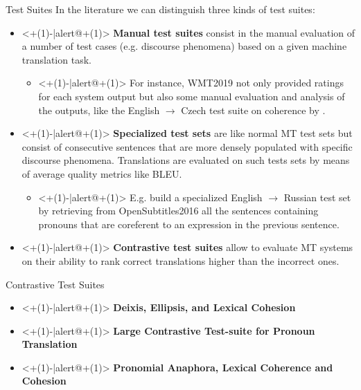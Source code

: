 \begin{frame}{Test Suites}\label{fr:test_suites_intro}
	In the literature we can distinguish three kinds of test suites:
	\begin{itemize}
		\item<+(1)-|alert@+(1)> \textbf{Manual test suites} consist in the manual evaluation of a number of test cases (e.g. discourse phenomena) based on a given machine translation task.
		\begin{itemize}
			\item<+(1)-|alert@+(1)> For instance, WMT2019 not only provided ratings for each system output but also some manual evaluation and analysis of the outputs, like the English $\rightarrow$ Czech test suite on coherence by \cite{rysova_test_2019}.
		\end{itemize}
		\item<+(1)-|alert@+(1)> \textbf{Specialized test sets} are like normal MT test sets but consist of consecutive sentences that are more densely populated with specific discourse phenomena. Translations are evaluated on such tests sets by means of average quality metrics like BLEU.
		\begin{itemize}
			\item<+(1)-|alert@+(1)> E.g. \cite{voita_context-aware_2018} build a specialized English $\rightarrow$ Russian test set by retrieving from OpenSubtitles2016 all the sentences containing pronouns that are coreferent to an expression in the previous sentence.
		\end{itemize}
		\item<+(1)-|alert@+(1)> \textbf{Contrastive test suites} allow to evaluate MT systems on their ability to rank correct translations higher than the incorrect ones.
	\end{itemize}
\end{frame}

\begin{frame}{Contrastive Test Suites}
	\begin{itemize}
		\item<+(1)-|alert@+(1)>  \textbf{Deixis, Ellipsis, and Lexical Cohesion} \cite{voita_when_2019}
		\item<+(1)-|alert@+(1)> \textbf{Large Contrastive Test-suite for Pronoun Translation} \cite{muller_large-scale_2018}
		\item<+(1)-|alert@+(1)> \textbf{Pronomial Anaphora, Lexical Coherence and Cohesion} \cite{bawden_evaluating_2018}
	\end{itemize}
\end{frame}

